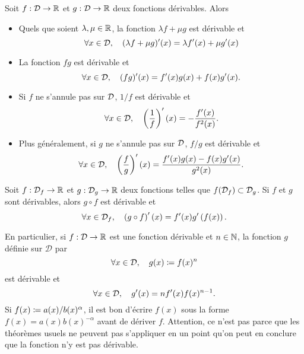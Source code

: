 \documentclass{magnolia}
\begin{document}
\begin{proposition}[utile=-3, nom={Théorèmes usuels}]
Soit $f:\mathcal{D}\to\mathbb{R}$ et $g:\mathcal{D}\to\mathbb{R}$ deux fonctions dérivables. Alors
\begin{itemize}
\item Quels que soient $\lambda, \mu\in\mathbb{R}$, la fonction
  $\lambda f+\mu g$ est dérivable et
  \[\forall x\in\mathcal{D},\quad (\lambda f+\mu g)'(x)=\lambda f'(x)+\mu g'(x)\]
\item La fonction $fg$ est dérivable et
  \[\forall x\in\mathcal{D},\quad (fg)'(x)=f'(x)g(x)+f(x)g'(x).\]
\item Si $f$ ne s'annule pas sur $\mathcal{D}$, $1/f$ est dérivable et
  \[\forall x\in\mathcal{D},\quad \left(\frac{1}{f}\right)'(x)=-\frac{f'(x)}{f^2(x)}.\]
\item Plus généralement, si $g$ ne s'annule pas sur $\mathcal{D}$, $f/g$ est dérivable
  et
  \[\forall x\in\mathcal{D},\quad \left(\frac{f}{g}\right)'(x)=\frac{f'(x)g(x)-f(x)g'(x)}{g^2(x)}.\]
\end{itemize}
\end{proposition}

\begin{proposition}[utile=-3, nom={Théorèmes usuels}]
Soit $f:\mathcal{D}_f\to\mathbb{R}$ et $g:\mathcal{D}_g\to\mathbb{R}$ deux fonctions telles que  $f(\mathcal{D}_f)\subset\mathcal{D}_g$. Si 
$f$ et $g$ sont dérivables, alors $g\circ f$ est dérivable et
\[\forall x\in\mathcal{D}_f,\quad \left(g\circ f\right)'(x)=f'(x)g'\left(f(x)\right).\]
\end{proposition}

\begin{remarqueUnique}
\remarque En particulier, si $f:\mathcal{D}\to\mathbb{R}$ est une fonction dérivable et $n\in\mathbb{N}$, la fonction $g$ définie sur $\mathcal{D}$ par
\[\forall x\in\mathcal{D},\quad g(x)\coloneqq f(x)^n\]
est dérivable et
\[\forall x\in\mathcal{D},\quad g'(x)=n f'(x) f(x)^{n-1}.\]
\remarque Si $f(x)\coloneqq a(x)/b(x)^\alpha$, il est bon d'écrire $f(x)$ sous la forme $f(x)=a(x)b(x)^{-\alpha}$ avant de dériver $f$.
\remarque Attention, ce n'est pas parce que les théorèmes usuels ne peuvent pas s'appliquer en un point qu'on peut en conclure que la fonction n'y est pas dérivable.
\end{remarqueUnique}
\end{document}
